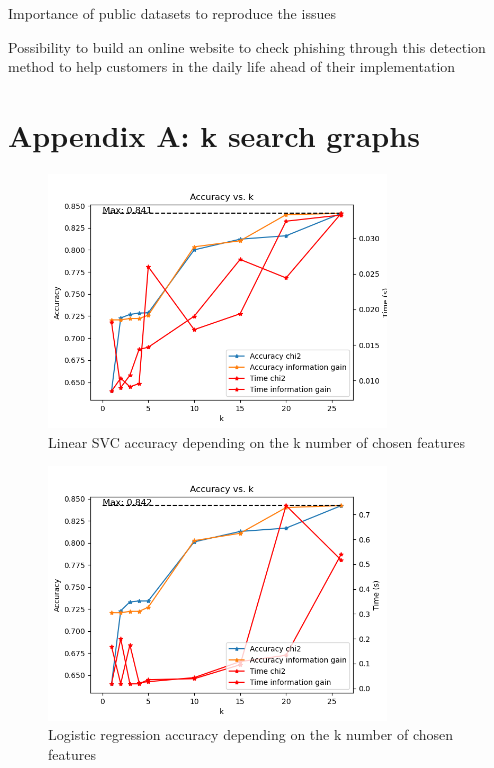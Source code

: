 \documentclass{article}
\begin{document}
    Importance of public datasets to reproduce the issues

    Possibility to build an online website to check phishing through this detection method to help customers in the daily life ahead of their implementation

    
    

    \appendix


    \section{Appendix A: k search graphs}\label{sec:appendixA}

    \begin{figure}[H]
        \centering
        \includegraphics[width=0.8\textwidth]{report_img/k_search/linear_svc}
        \caption{Linear SVC accuracy depending on the k number of chosen features}
        \label{fig:}
    \end{figure}

    \begin{figure}[H]
        \centering
        \includegraphics[width=0.8\textwidth]{report_img/k_search/logistic_regression}
        \caption{Logistic regression accuracy depending on the k number of chosen features}
        \label{fig:}
    \end{figure}
\end{document}
